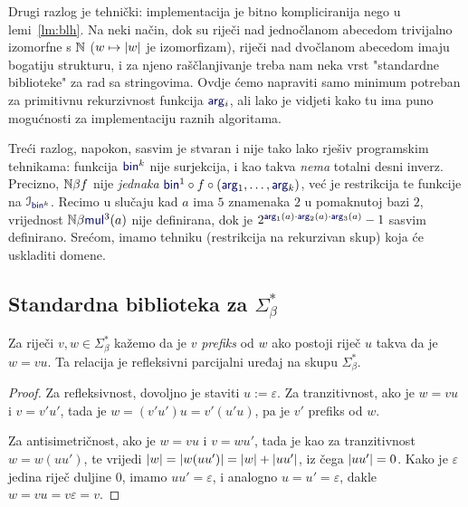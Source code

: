 Drugi razlog je tehnički: implementacija je bitno kompliciranija nego u lemi~\ref{lm:blh}. Na neki način, dok su riječi nad jednočlanom abecedom trivijalno izomorfne s ${\mathbb N}$ ($w\mapsto\lvert w\rvert$ je izomorfizam), riječi nad dvočlanom abecedom imaju bogatiju strukturu, i za njeno raščlanjivanje treba nam neka vrst "standardne biblioteke" za rad sa stringovima. Ovdje ćemo napraviti samo minimum potreban za primitivnu rekurzivnost funkcija $\f{arg}_i$, ali lako je vidjeti kako tu ima puno mogućnosti za implementaciju raznih algoritama.

Treći razlog, napokon, sasvim je stvaran i nije tako lako rješiv programskim tehnikama: funkcija $\f{bin}^k$ nije surjekcija, i kao takva \emph{nema} totalni desni inverz. Precizno, ${\mathbb N}\beta f$ nije \emph{jednaka} $\f{bin}^1\circ f\circ(\f{arg}_1,\dotsc,\f{arg}_k)$, već je restrikcija te funkcije na $\im{\f{bin}^k}$. %
Recimo u slučaju kad $a$ ima $5$ znamenaka $2$ u pomaknutoj bazi $2$, vrijednost $\N\beta\f{mul}^3(a)$ nije definirana, dok je $2^{\f{arg}_1(a)\cdot\f{arg}_2(a)\cdot\f{arg}_3(a)}-1$ sasvim definirano. Srećom, imamo tehniku (restrikcija na rekurzivan skup) koja će uskladiti domene.

\subsection{Standardna biblioteka za \texorpdfstring{$\Sigma_\beta^*$}{binarne stringove}}\label{sec:stdstring}

\begin{propozicija}[{name=["biti prefiks" je parcijalni uređaj]}]\label{pp:prefiksrpu}
Za riječi $v,w\in\Sigma_\beta^*$ kažemo da je $v$ \emph{prefiks} od $w$ ako postoji riječ $u$ takva da je $w=vu$.
Ta relacija je refleksivni parcijalni uređaj na skupu $\Sigma_\beta^*$.
\end{propozicija}
\begin{proof}
Za refleksivnost, dovoljno je staviti $u:=\varepsilon$. Za tranzitivnost, ako je $w=vu$ i $v=v'u'$, tada je $w=(v'u')u=v'(u'u)$, pa je $v'$ prefiks od $w$.

Za antisimetričnost, ako je $w=vu$ i $v=wu'$, tada je kao za tranzitivnost $w=w(uu')$, te vrijedi $\lvert w\rvert=\lvert w(uu')\rvert=\lvert w\rvert+\lvert uu'\rvert$, iz čega $\lvert uu'\rvert=0$. Kako je $\varepsilon$ jedina riječ duljine $0$, imamo $uu'=\varepsilon$, i analogno $u=u'=\varepsilon$, dakle $w=vu=v\varepsilon=v$.
\end{proof}

